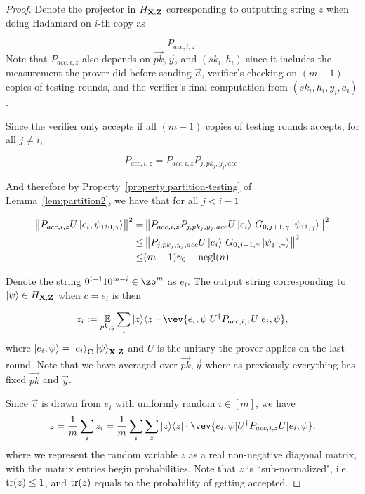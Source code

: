 \begin{proof}
	Denote the projector in $H_{\mathbf{X},\mathbf{Z}}$ corresponding to outputting string $z$ when doing Hadamard on $i$-th copy as

	$$P_{acc,i,z}.$$
	Note that $P_{acc,i,z}$ also depends on $\vec{pk}, \vec{y}$, and $(sk_i, h_i)$ since it includes the measurement the prover did before sending $\vec{a}$,  verifier's checking on $(m-1)$ copies of testing rounds, and  the verifier's final computation from $(sk_i,h_i,y_i,a_i)$.

	Since the verifier only accepts if all $(m-1)$ copies of testing rounds accepts, for all $j\neq i$,

	$$P_{acc,i,z}=P_{acc,i,z}P_{j,pk_j,y_j,acc}.$$

	And therefore by Property~\ref{property:partition-testing} of Lemma~\ref{lem:partition2}, we have that for all $j <i-1$   %

	\begin{align} \label{eq:rejected-d}
		\left\lVert P_{acc,i,z} U \ket{e_i, \psi_{1^j0,\gamma}}\right\rVert^2
		=& \left\lVert P_{acc,i,z}P_{j,pk_j,y_j,acc} U \ket{e_i}\, G_{0,j+1,\gamma}\ket{\psi_{1^j,\gamma}}  \right\rVert^2 \nonumber \\
		\leq& \left\lVert P_{j,pk_j,y_j,acc} U \ket{e_i}\, G_{0,j+1,\gamma}\ket{\psi_{1^j,\gamma}}  \right\rVert^2 \nonumber \\
		\leq& (m-1)\gamma_0+\operatorname{negl}(n)
	\end{align}


	Denote the string $0^{i-1}10^{m-i} \in \zo^m $ as $e_i$. The output string corresponding to $\ket{\psi} \in H_{\mathbf{X},\mathbf{Z}}$ when $c=e_i$ is then




	$$z_i\defeq \E_{pk,y} \sum_z \proj{z} \cdot \vev{e_i,\psi|U^\dag P_{acc,i,z} U|e_i,\psi},$$
	where $\ket{e_i,\psi}=\ket{e_i}_{\mathbf{C}}\ket{\psi}_{\mathbf{X},\mathbf{Z}}$ and $U$ is the unitary the prover applies on the last round. Note that we have averaged over $\vec{pk}, \vec{y}$ where as previously everything has fixed $\vec{pk}$ and $\vec{y}$.

	Since $\vec{c}$ is drawn  from $e_i$ with uniformly random $i\in [m]$, we have
$$ z=\frac{1}{m} \sum_i z_i= \frac{1}{m} \sum_i \sum_z \proj{z} \cdot \vev{e_i,\psi|U^\dag P_{acc,i,z} U|e_i,\psi},$$
	where we represent the random variable $z$ as a real non-negative diagonal matrix, with the matrix entries begin  probabilities. Note that $z$ is ``sub-normalized", i.e. $\operatorname{tr} (z) \leq 1 \text{}$, and $\operatorname{tr}(z)$ equals to the probability of getting accepted.







\end{proof}
